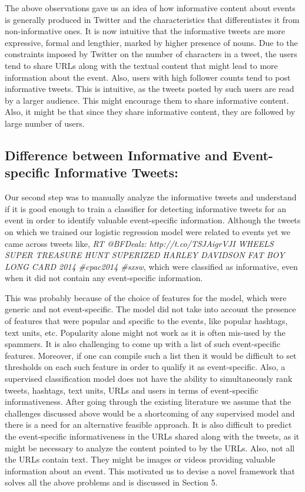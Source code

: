The above observations gave us an idea of how informative content about events is generally produced in Twitter and the characteristics that differentiates it from non-informative ones. It is now intuitive that the informative tweets are more expressive, formal and lengthier, marked by higher presence of nouns. Due to the constraints imposed by Twitter on the number of characters in a tweet, the users tend to share URLs along with the textual content that might lead to more information about the event. Also, users with high follower counts tend to post informative tweets. This is intuitive, as the tweets posted by such users are read by a larger audience. This might encourage them to share informative content. Also, it might be that since they share informative content, they are followed by large number of users.

\subsection{Difference between Informative and Event-specific Informative Tweets:} Our second step was to manually analyze the informative tweets and understand if it is good enough to train a classifier for detecting informative tweets for an event in order to identify valuable event-specific information. Although the tweets on which we trained our logistic regression model were related to events yet we came across tweets like, \textit{RT @BFDealz: http://t.co/TSJAigrVJI WHEELS SUPER TREASURE HUNT SUPERIZED HARLEY DAVIDSON FAT BOY LONG CARD 2014 \#cpac2014 \#sxsw}, which were classified as informative, even when it did not contain any event-specific information. 

This was probably because of the choice of features for the model, which were generic and not event-specific. The model did not take into account the presence of features that were popular and specific to the events, like popular hashtags, text units, etc. Popularity alone might not work as it is often mis-used by the spammers. It is also challenging to come up with a list of such event-specific features. Moreover, if one can compile such a list then it would be difficult to set thresholds on each such feature in order to qualify it as event-specific. Also, a supervised classification model does not have the ability to simultaneously rank tweets, hashtags, text units, URLs and users in terms of event-specific informativeness. After going through the existing literature we assume that the challenges discussed above would be a shortcoming of any supervised model and there is a need for an alternative feasible approach. It is also difficult to predict the event-specific informativeness in the URLs shared along with the tweets, as it might be necessary to analyze the content pointed to by the URLs. Also, not all the URLs contain text. They might be images or videos providing valuable information about an event. This motivated us to devise a novel framework that solves all the above problems and is discussed in Section 5.
 


